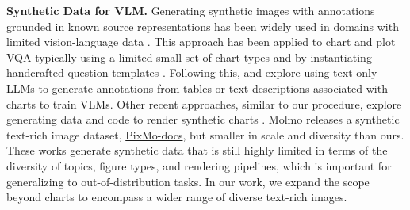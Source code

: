 \smallbreak
\noindent \textbf{Synthetic Data for VLM.} Generating synthetic images with annotations grounded in known source representations has been widely used in domains with limited vision-language data \citep{virtualworldannotation,clevr,simvqa,provision}. 
This approach has been applied to chart and plot VQA typically using a limited small set of chart types and by instantiating handcrafted question templates \citep{kahou2017figureqa,kafle2018dvqa,methani2020plotqa,leafqa++}.
Following this, \citet{scigraphqa} and \citet{chartbasedreasoning} explore using text-only LLMs to generate annotations from tables or text descriptions associated with charts to train VLMs. 
Other recent approaches, similar to our procedure, explore generating data and code to render synthetic charts \cite{chartllama,sbsfigures,chartx}.
Molmo \cite{deitke2024molmo} releases a synthetic text-rich image dataset, \href{https://huggingface.co/datasets/allenai/pixmo-docs}{PixMo-docs}, but smaller in scale and diversity than ours.
These works generate synthetic data that is still highly limited in terms of the diversity of topics, figure types, and rendering pipelines, which is important for generalizing to out-of-distribution tasks. 
In our work, we expand the scope beyond charts to encompass a wider range of diverse text-rich images.